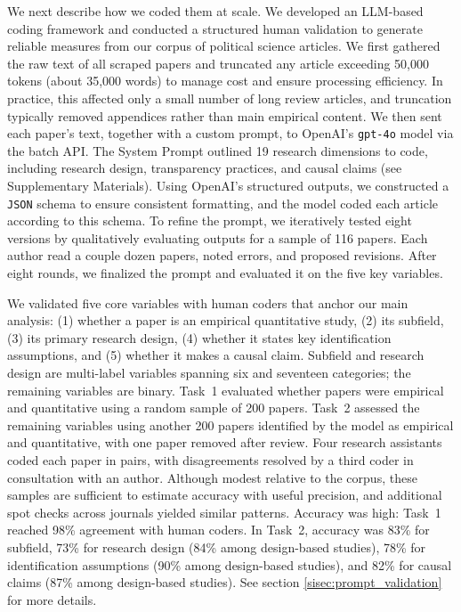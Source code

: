 \documentclass[12pt]{article}
\begin{document}
We next describe how we coded them at scale. We developed an LLM-based coding framework and conducted a structured human validation to generate reliable measures from our corpus of political science articles. We first gathered the raw text of all scraped papers and truncated any article exceeding 50,000 tokens (about 35,000 words) to manage cost and ensure processing efficiency. In practice, this affected only a small number of long review articles, and truncation typically removed appendices rather than main empirical content. We then sent each paper's text, together with a custom prompt, to OpenAI's \texttt{gpt-4o} model via the batch API. The System Prompt outlined 19 research dimensions to code, including research design, transparency practices, and causal claims (see Supplementary Materials). Using OpenAI's structured outputs, we constructed a \texttt{JSON} schema to ensure consistent formatting, and the model coded each article according to this schema. To refine the prompt, we iteratively tested eight versions by qualitatively evaluating outputs for a sample of 116 papers. Each author read a couple dozen papers, noted errors, and proposed revisions. After eight rounds, we finalized the prompt and evaluated it on the five key variables.

We validated five core variables with human coders that anchor our main analysis: (1) whether a paper is an empirical quantitative study, (2) its subfield, (3) its primary research design, (4) whether it states key identification assumptions, and (5) whether it makes a causal claim. Subfield and research design are multi-label variables spanning six and seventeen categories; the remaining variables are binary. Task~1 evaluated whether papers were empirical and quantitative using a random sample of 200 papers. Task~2 assessed the remaining variables using another 200 papers identified by the model as empirical and quantitative, with one paper removed after review. Four research assistants coded each paper in pairs, with disagreements resolved by a third coder in consultation with an author. Although modest relative to the corpus, these samples are sufficient to estimate accuracy with useful precision, and additional spot checks across journals yielded similar patterns. Accuracy was high: Task~1 reached 98\% agreement with human coders. In Task~2, accuracy was 83\% for subfield, 73\% for research design (84\% among design-based studies), 78\% for identification assumptions (90\% among design-based studies), and 82\% for causal claims (87\% among design-based studies). See section \ref{sisec:prompt_validation} for more details.
\end{document}
